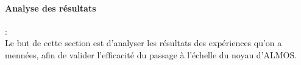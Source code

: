 \paragraph{Analyse des résultats}:\\

Le but de cette section est d'analyser les résultats des expériences qu'on a mennées, afin de valider l'efficacité du passage à l'échelle du noyau d'ALMOS.
